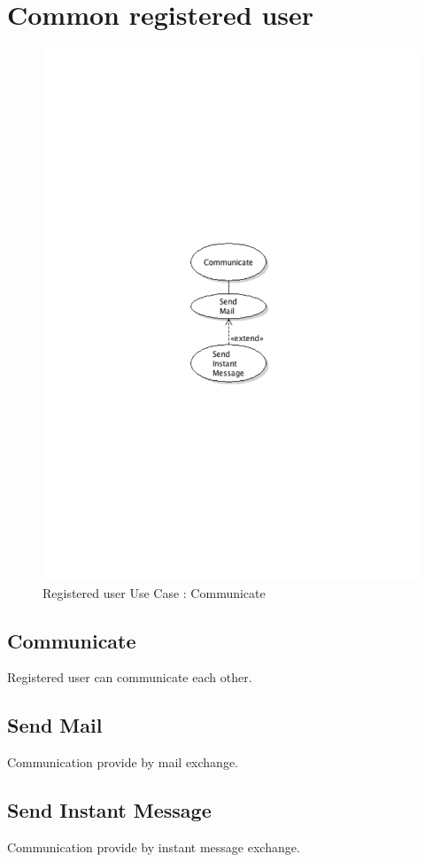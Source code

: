 \section{Common registered user}
	\begin{figure}[ht]
		\begin{center}
			\includegraphics[width=\textwidth,  trim=2cm 10cm 2cm 11cm]{UML_figure/UC/common/UC_Common_Communicate.pdf}
			\caption{Registered user Use Case : Communicate}
		\end{center}
	\end{figure}
	\subsection{Communicate}
		Registered user can communicate each other.
	\subsection{Send Mail}
		Communication provide by mail exchange.
	\subsection{Send Instant Message}
		Communication provide by instant message exchange.













